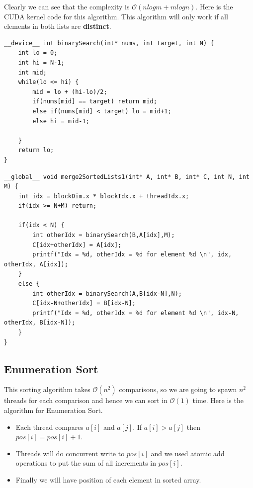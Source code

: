 Clearly we can see that the complexity is $\mathcal{O}(nlogm + mlogn)$. Here is the CUDA kernel code for this algorithm. This algorithm will only work if all elements in both lists are \textbf{distinct}.


\begin{lstlisting}
__device__ int binarySearch(int* nums, int target, int N) {
    int lo = 0;
    int hi = N-1;
    int mid;
    while(lo <= hi) {
        mid = lo + (hi-lo)/2;
        if(nums[mid] == target) return mid;
        else if(nums[mid] < target) lo = mid+1;
        else hi = mid-1;

    }
    return lo;
}
\end{lstlisting}


\begin{lstlisting}
__global__ void merge2SortedLists1(int* A, int* B, int* C, int N, int M) {
    int idx = blockDim.x * blockIdx.x + threadIdx.x;
    if(idx >= N+M) return;

    if(idx < N) {
        int otherIdx = binarySearch(B,A[idx],M);
        C[idx+otherIdx] = A[idx];
        printf("Idx = %d, otherIdx = %d for element %d \n", idx, otherIdx, A[idx]);
    }
    else {
        int otherIdx = binarySearch(A,B[idx-N],N);
        C[idx-N+otherIdx] = B[idx-N];
        printf("Idx = %d, otherIdx = %d for element %d \n", idx-N, otherIdx, B[idx-N]);
    }
}
\end{lstlisting}

\subsection*{Enumeration Sort}
This sorting algorithm takes $\mathcal{O}(n^2)$ comparisons, so we are going to spawn $n^2$ threads for each comparison and hence we can sort in $\mathcal{O}(1)$ time. Here is the algorithm for Enumeration Sort.

\begin{itemize}
    \item Each thread compares $a[i]$ and $a[j]$. If $a[i] > a[j]$ then $pos[i] = pos[i] + 1$.
    \item Threads will do concurrent write to $pos[i]$ and we used atomic add operations to put the sum of all increments in $pos[i]$.
    \item Finally we will have position of each element in sorted array.
\end{itemize}

